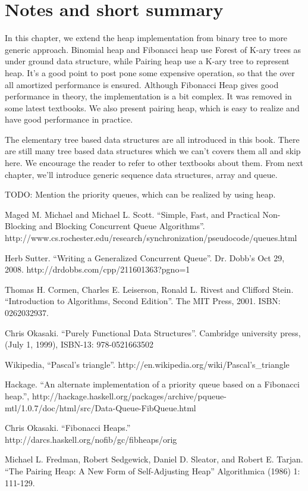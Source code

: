 \documentclass{article}
\begin{document}
\section{Notes and short summary}

In this chapter, we extend the heap implementation from binary tree to
more generic approach. Binomial heap and Fibonacci heap use Forest of 
K-ary trees as under ground data structure, while Pairing heap use
a K-ary tree to represent heap. It's a good point to post pone some
expensive operation, so that the over all amortized performance is
ensured. Although Fibonacci Heap gives good performance in theory, the
implementation is a bit complex. It was removed in some latest textbooks.
We also present pairing heap, which is easy to realize and have good
performance in practice.

The elementary tree based data structures are all introduced in this
book. There are still many tree based data structures which we can't 
covers them all and skip here. We encourage the reader to refer to 
other textbooks about them. From next chapter, we'll introduce generic
sequence data structures, array and queue.

TODO: Mention the priority queues, which can be realized by using heap.


\begin{thebibliography}{99}

Maged M. Michael and Michael L. Scott. ``Simple, Fast, and Practical Non-Blocking and Blocking Concurrent Queue Algorithms''. http://www.cs.rochester.edu/research/synchronization/pseudocode/queues.html

Herb Sutter. ``Writing a Generalized Concurrent Queue''. Dr. Dobb's Oct 29, 2008. http://drdobbs.com/cpp/211601363?pgno=1

Thomas H. Cormen, Charles E. Leiserson, Ronald L. Rivest and Clifford Stein. ``Introduction to Algorithms, Second Edition''. The MIT Press, 2001. ISBN: 0262032937.

Chris Okasaki. ``Purely Functional Data Structures''. Cambridge university press, (July 1, 1999), ISBN-13: 978-0521663502

Wikipedia, ``Pascal's triangle''. http://en.wikipedia.org/wiki/Pascal's\_triangle

Hackage. ``An alternate implementation of a priority queue based on a Fibonacci heap.'', http://hackage.haskell.org/packages/archive/pqueue-mtl/1.0.7/doc/html/src/Data-Queue-FibQueue.html

Chris Okasaki. ``Fibonacci Heaps.'' http://darcs.haskell.org/nofib/gc/fibheaps/orig

Michael L. Fredman, Robert Sedgewick, Daniel D. Sleator, and Robert E. Tarjan. ``The Pairing Heap: A New Form of Self-Adjusting Heap'' Algorithmica (1986) 1: 111-129.

\end{thebibliography}

\ifx\wholebook\relax \else
\end{document}
